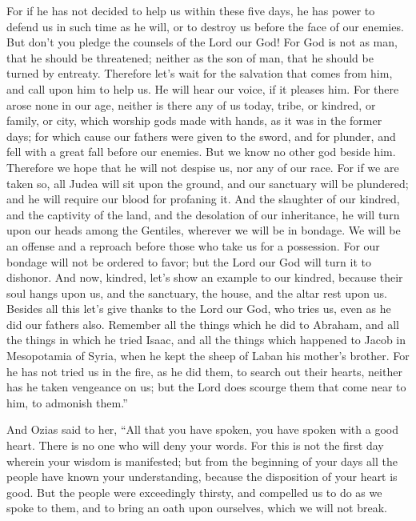 {For if he has not decided to help us within these five days, he has power to defend us in such time as he will, or to destroy us before the face of our enemies.
But don’t you pledge the counsels of the Lord our God! For God is not as man, that he should be threatened; neither as the son of man, that he should be turned by entreaty.
Therefore let’s wait for the salvation that comes from him, and call upon him to help us. He will hear our voice, if it pleases him.
For there arose none in our age, neither is there any of us today, tribe, or kindred, or family, or city, which worship gods made with hands, as it was in the former days;
for which cause our fathers were given to the sword, and for plunder, and fell with a great fall before our enemies.
But we know no other god beside him. Therefore we hope that he will not despise us, nor any of our race.
For if we are taken so, all Judea will sit upon the ground, and our sanctuary will be plundered; and he will require our blood for profaning it.
And the slaughter of our kindred, and the captivity of the land, and the desolation of our inheritance, he will turn upon our heads among the Gentiles, wherever we will be in bondage. We will be an offense and a reproach before those who take us for a possession.
For our bondage will not be ordered to favor; but the Lord our God will turn it to dishonor.
And now, kindred, let’s show an example to our kindred, because their soul hangs upon us, and the sanctuary, the house, and the altar rest upon us.
Besides all this let’s give thanks to the Lord our God, who tries us, even as he did our fathers also.
Remember all the things which he did to Abraham, and all the things in which he tried Isaac, and all the things which happened to Jacob in Mesopotamia of Syria, when he kept the sheep of Laban his mother’s brother.
For he has not tried us in the fire, as he did them, to search out their hearts, neither has he taken vengeance on us; but the Lord does scourge them that come near to him, to admonish them.”
\par }{\PP {}And Ozias said to her, “All that you have spoken, you have spoken with a good heart. There is no one who will deny your words.
For this is not the first day wherein your wisdom is manifested; but from the beginning of your days all the people have known your understanding, because the disposition of your heart is good.
But the people were exceedingly thirsty, and compelled us to do as we spoke to them, and to bring an oath upon ourselves, which we will not break.
}

